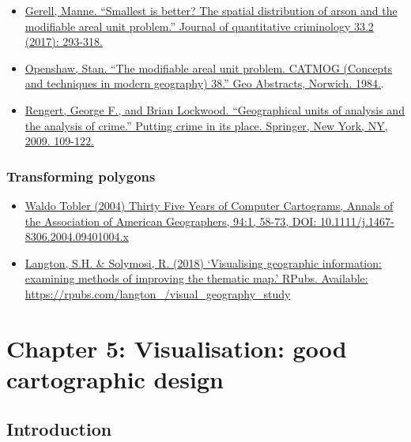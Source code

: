 \documentclass[
]{book}
\providecommand{\tightlist}{%
  \setlength{\itemsep}{0pt}\setlength{\parskip}{0pt}}
\begin{document}
\begin{itemize}
\tightlist
\item
  \href{https://link.springer.com/article/10.1007/s10940-016-9297-6}{Gerell, Manne. ``Smallest is better? The spatial distribution of arson and the modifiable areal unit problem.'' Journal of quantitative criminology 33.2 (2017): 293-318.}
\item
  \href{https://www.uio.no/studier/emner/sv/iss/SGO9010/openshaw1983.pdf}{Openshaw, Stan. ``The modifiable areal unit problem. CATMOG (Concepts and techniques in modern geography) 38.'' Geo Abstracts, Norwich. 1984.}.
\item
  \href{https://link.springer.com/chapter/10.1007/978-0-387-09688-9_5}{Rengert, George F., and Brian Lockwood. ``Geographical units of analysis and the analysis of crime.'' Putting crime in its place. Springer, New York, NY, 2009. 109-122.}
\end{itemize}

\hypertarget{transforming-polygons-1}{%
\subsection{Transforming polygons}\label{transforming-polygons-1}}

\begin{itemize}
\tightlist
\item
  \href{https://www.tandfonline.com/doi/full/10.1111/j.1467-8306.2004.09401004.x}{Waldo Tobler (2004) Thirty Five Years of Computer Cartograms, Annals of the Association of American Geographers, 94:1, 58-73, DOI: 10.1111/j.1467-8306.2004.09401004.x}
\item
  \href{https://rpubs.com/langton_/visual_geography_study}{Langton, S.H. \& Solymosi, R. (2018) `Visualising geographic information: examining methods of improving the thematic map.' RPubs. Available: https://rpubs.com/langton\_/visual\_geography\_study}
\end{itemize}

\hypertarget{chapter-5-visualisation-good-cartographic-design}{%
\chapter{Chapter 5: Visualisation: good cartographic design}\label{chapter-5-visualisation-good-cartographic-design}}

\hypertarget{introduction-5}{%
\section{Introduction}\label{introduction-5}}
\end{document}

